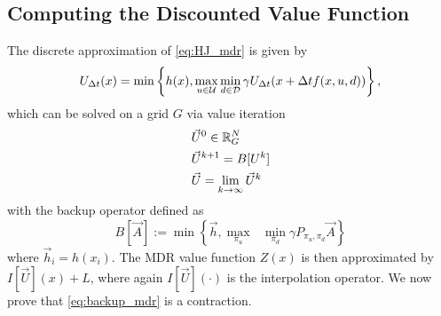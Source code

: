 %


%





\subsection{Computing the Discounted Value Function}
The discrete approximation of \eqref{eq:HJ_mdr} is given by
%
\begin{equation}\label{eq:U_approx}
    U_{\Delta t} (x) = \min\left\{h(x), \max_{u\in\mathcal{U}} \min_{ d\in\mathcal{D}}  \gamma U_{\Delta t}(x+\Delta tf(x,u,d))\right\},
\end{equation}%
\noindent which can be solved on a grid $G$ via value iteration 
%
\begin{subequations} \label{eq:val_iter_backup}
\begin{align}
&\vec{U}^{0} \in \mathbb{R}^N_G\\
&\vec{U}^{k+1} = B[U^k]\\
&\vec{U} = \lim_{k\rightarrow \infty} \vec{U}^{k}
\end{align}
\end{subequations}%
\noindent with the backup operator defined as
%
\begin{equation} \label{eq:backup_mdr}
B[\vec{A}] := \min\left\{ \vec{h}, \underset{\pi_u}{\max}\text{ }\underset{ \pi_d}{\min} \gamma P_{\pi_u, \pi_d} \vec{A} \right \}
\end{equation}%
\noindent where $\vec{h}_i = h(x_i)$. The MDR value function $Z(x)$ is then approximated by $I[\vec{U}](x)+L$, where again $I[\vec{U}](\cdot)$ is the interpolation operator. We now prove that \eqref{eq:backup_mdr} is a contraction.

